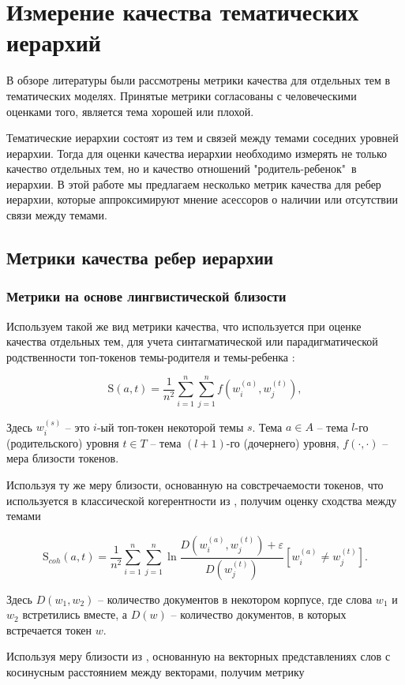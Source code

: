 \chapter{Измерение качества тематических иерархий}
В обзоре литературы были рассмотрены метрики качества для отдельных тем в тематических моделях. Принятые метрики согласованы с человеческими оценками того, является тема хорошей или плохой.

Тематические иерархии состоят из тем и связей между темами соседних уровней иерархии. Тогда для оценки качества иерархии необходимо измерять не только качество отдельных тем, но и качество отношений "родитель-ребенок"\ в иерархии. В этой работе мы предлагаем несколько метрик качества для ребер иерархии, которые аппроксимируют мнение асессоров о наличии или отсутствии связи между темами.  

\section{Метрики качества ребер иерархии}
\subsection{Метрики на основе лингвистической близости}
 Используем такой же вид метрики качества, что используется при оценке качества отдельных тем, для учета синтагматической или парадигматической родственности топ-токенов темы-родителя и темы-ребенка \cite{Schutze1993}:

$$\mathrm{S}(a, t) = \dfrac{1}{n^2}\sum\limits_{i=1}^{n}\sum\limits_{j=1}^n f(w_i^{(a)}, w_j^{(t)}),$$

Здесь $w_i^{(s)}$ -- это $i$-ый топ-токен некоторой темы $s$. Тема $a \in A$ -- тема $l$-го (родительского) уровня $t\in T$ -- тема $(l+1)$-го (дочернего) уровня, $f(\cdot, \cdot)$ -- мера близости токенов.

Используя ту же меру близости, основанную на совстречаемости токенов, что используется в классической когерентности из \cite{Mimno2011}, получим оценку сходства между темами 

$$\mathrm{S}_{coh}(a, t) = \dfrac{1}{n^2}\sum\limits_{i=1}^n \sum\limits_{j=1}^n \ln \dfrac{D(w^{(a)}_i, w^{(t)}_j) + \varepsilon}{D(w^{(t)}_j)}[w_i^{(a)} \neq w_j^{(t)}].$$ 

Здесь $D(w_1, w_2)$ -- количество документов в некотором корпусе, где слова $w_1$ и $w_2$ встретились вместе, а $D(w)$ -- количество документов, в которых встречается токен $w$.

Используя меру близости из \cite{Nikolenko2016}, основанную на векторных представлениях слов с косинусным расстоянием между векторами, получим метрику 

